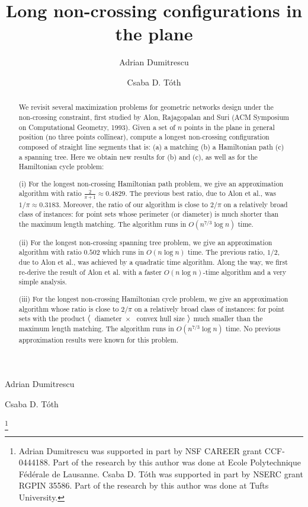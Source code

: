 \documentclass[proceedings]{stacs}
\begin{document}
\title{Long non-crossing configurations in the plane}


\author[lab1]{Adrian Dumitrescu}{Adrian Dumitrescu}
\address[lab1]{Department of Computer Science,
University of Wisconsin--Milwaukee,
WI 53201-0784, USA}

\author[lab2]{Csaba D. T\'oth}{Csaba D. T\'oth}
\address[lab2]{Department of Mathematics and Statistics,
University of Calgary, AB, Canada}

\thanks{Adrian Dumitrescu was supported in part by NSF CAREER grant CCF-0444188.
Part of the research by this author was done at
Ecole Polytechnique F\'ed\'erale de Lausanne.
Csaba D. T\'oth was supported in part by NSERC grant RGPIN 35586. Part
of the research by this author was done at Tufts University.}



\begin{abstract}
We revisit several maximization problems for geometric networks design
under the non-crossing constraint, first studied by Alon, Rajagopalan
and Suri (ACM Symposium on Computational Geometry, 1993).
Given a set of $n$ points in the plane in general position (no three points
collinear), compute a longest non-crossing configuration composed of
straight line segments that is: (a) a matching  (b) a Hamiltonian path
(c) a spanning tree. Here we obtain new results for (b) and (c),
as well as for the Hamiltonian cycle problem:

(i)  For the longest non-crossing Hamiltonian path problem,
we give an approximation algorithm with ratio $\frac{2}{\pi+1} \approx 0.4829$.
The previous best ratio, due to Alon et al., was $1/\pi \approx 0.3183$.
Moreover, the ratio of our algorithm is close to $2/\pi$ on a relatively broad
class of instances: for point sets whose perimeter (or diameter) is
much shorter than the maximum length matching.
The algorithm runs in $O(n^{7/3}\log{n})$ time.

(ii) For the longest non-crossing spanning tree problem, we give an
approximation algorithm with ratio $0.502$ which runs in $O(n \log{n})$  time.
The previous ratio, $1/2$, due to Alon et al., was achieved by a
quadratic time algorithm. Along the way, we first re-derive the result
of Alon et al. with a faster $O(n \log{n})$-time algorithm and a very
simple analysis.

(iii)  For the longest non-crossing Hamiltonian cycle problem,
we give an approximation algorithm whose ratio is close to $2/\pi$ on a
relatively broad class of instances: for point sets with the product
$\bf{\langle}$~diameter~$\times$ ~convex hull size $\bf{\rangle}$ much smaller
than the maximum length matching. The algorithm runs in
$O(n^{7/3}\log{n})$ time. No previous approximation results
were known for this problem.
\end{abstract}
\end{document}
